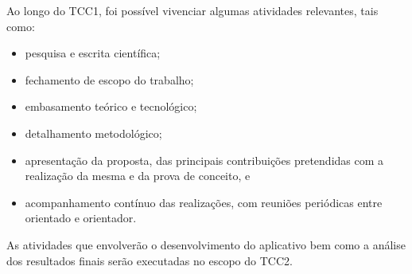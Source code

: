 Ao longo do TCC1, foi possível vivenciar algumas atividades relevantes, tais como:

\begin{itemize}
    \item pesquisa e escrita científica;
    \item fechamento de escopo do trabalho;
    \item embasamento teórico e tecnológico;
    \item detalhamento metodológico;
    \item apresentação da proposta, das principais contribuições pretendidas com a realização da mesma e da prova de conceito, e
    \item acompanhamento contínuo das realizações, com reuniões periódicas entre orientado e orientador.
\end{itemize}

As atividades que envolverão o desenvolvimento do aplicativo bem como a análise dos resultados finais serão executadas no escopo do TCC2.

